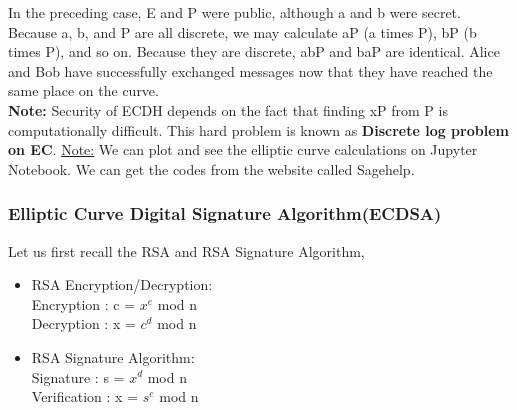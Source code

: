 \documentclass[11pt]{article}
\begin{document}
In the preceding case, E and P were public, although a and b were secret. Because a, b, and P are all discrete, we may calculate aP (a times P), bP (b times P), and so on. Because they are discrete, abP and baP are identical. Alice and Bob have successfully exchanged messages now that they have reached the same place on the curve.\\
\newline
\textbf{Note:} Security of ECDH depends on the fact that finding xP from P is computationally difficult. This hard problem is known as \textbf{Discrete log problem on EC}.
\underline{Note:} We can plot and see the elliptic curve calculations on Jupyter Notebook. We can get the codes from the website called Sagehelp.
\subsubsection{Elliptic Curve Digital Signature Algorithm(ECDSA)}
Let us first recall the RSA and RSA Signature Algorithm,
\begin{center}
    \begin{itemize}
        \item RSA Encryption/Decryption:\\
        Encryption : c = $x^e$ mod n\\
        Decryption : x = $c^d$ mod n\\
    
        \item RSA Signature Algorithm:\\
        Signature : s = $x^d$ mod n\\
        Verification : x = $s^e$ mod n\\
    \end{itemize}
\end{center}
\end{document}
